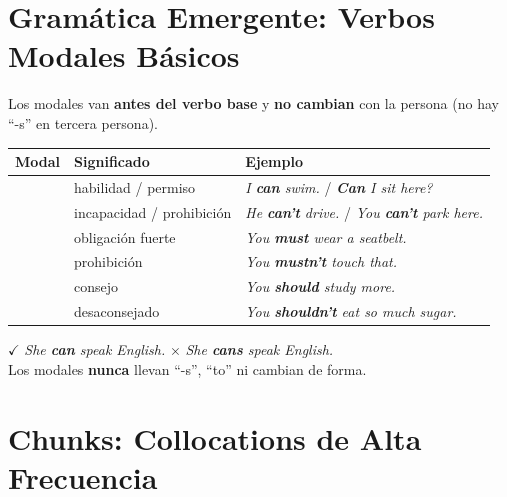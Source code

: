 \documentclass[12pt,a4paper]{article}
\begin{document}
\section{Gramática Emergente: Verbos Modales Básicos}

\begin{cajagrammar}
Los modales van \textbf{antes del verbo base} y \textbf{no cambian} con la persona (no hay ``-s'' en tercera persona).

\medskip
\begin{tabularx}{\textwidth}{@{} l l X @{}}
\toprule
\textbf{Modal} & \textbf{Significado} & \textbf{Ejemplo} \\
\midrule
\eng{can} & habilidad / permiso & \textit{I \textbf{can} swim.} / \textit{\textbf{Can} I sit here?} \\
\eng{can't} & incapacidad / prohibición & \textit{He \textbf{can't} drive.} / \textit{You \textbf{can't} park here.} \\
\eng{must} & obligación fuerte & \textit{You \textbf{must} wear a seatbelt.} \\
\eng{mustn't} & prohibición & \textit{You \textbf{mustn't} touch that.} \\
\eng{should} & consejo & \textit{You \textbf{should} study more.} \\
\eng{shouldn't} & desaconsejado & \textit{You \textbf{shouldn't} eat so much sugar.} \\
\bottomrule
\end{tabularx}

\medskip
\begin{cajaejemplo}
$\checkmark$ \textit{She \textbf{can} speak English.} \quad $\times$ \textit{She \textbf{cans} speak English.}\\
Los modales \textbf{nunca} llevan ``-s'', ``to'' ni cambian de forma.
\end{cajaejemplo}
\end{cajagrammar}

\section{Chunks: Collocations de Alta Frecuencia}
\end{document}
